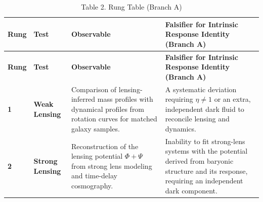 \documentclass[11pt]{article}
\begin{document}
\begin{longtable}[]{@{}
  >{\centering\arraybackslash}p{}
  >{\raggedright\arraybackslash}p{}
  >{\raggedright\arraybackslash}p{}
  >{\raggedright\arraybackslash}p{}@{}}
\caption{\protect{}\label{_Toc222952632}{}Table 2. Rung Table (Branch A)}\tabularnewline
\toprule\noalign{}
\begin{minipage}[b]{\linewidth}\centering
\textbf{Rung}
\end{minipage} & \begin{minipage}[b]{\linewidth}\centering
\textbf{Test}
\end{minipage} & \begin{minipage}[b]{\linewidth}\centering
\textbf{Observable}
\end{minipage} & \begin{minipage}[b]{\linewidth}\centering
\textbf{Falsifier for Intrinsic Response Identity (Branch A)}
\end{minipage} \\
\midrule\noalign{}
\endfirsthead
\toprule\noalign{}
\begin{minipage}[b]{\linewidth}\centering
\textbf{Rung}
\end{minipage} & \begin{minipage}[b]{\linewidth}\centering
\textbf{Test}
\end{minipage} & \begin{minipage}[b]{\linewidth}\centering
\textbf{Observable}
\end{minipage} & \begin{minipage}[b]{\linewidth}\centering
\textbf{Falsifier for Intrinsic Response Identity (Branch A)}
\end{minipage} \\
\midrule\noalign{}
\endhead
\bottomrule\noalign{}
\endlastfoot
\textbf{1} & \textbf{Weak Lensing} & Comparison of lensing-inferred mass profiles with dynamical profiles from rotation curves for matched galaxy samples. & A systematic deviation requiring \(\eta \neq 1\) or an extra, independent dark fluid to reconcile lensing and dynamics. \\
\textbf{2} & \textbf{Strong Lensing} & Reconstruction of the lensing potential \(\Phi + \Psi\) from strong lens modeling and time-delay cosmography. & Inability to fit strong-lens systems with the potential derived from baryonic structure and its response, requiring an independent dark component. \\

\end{longtable}
\end{document}
